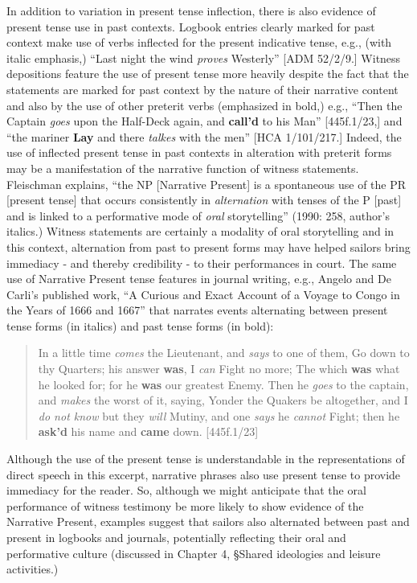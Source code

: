 \begin{styleStandard}
In addition to variation in present tense inflection, there is also evidence of present tense use in past contexts. Logbook entries clearly marked for past context make use of verbs inflected for the present indicative tense, e.g., (with italic emphasis,) “Last night the wind \textit{proves} Westerly” [ADM 52/2/9.] Witness depositions feature the use of present tense more heavily despite the fact that the statements are marked for past context by the nature of their narrative content and also by the use of other preterit verbs (emphasized in bold,) e.g., “Then the Captain \textit{goes} upon the Half-Deck again, and \textbf{call’d} to his Man” [445f.1/23,] and “the mariner \textbf{Lay} and there \textit{talkes} with the men” [HCA 1/101/217.] Indeed, the use of inflected present tense in past contexts in alteration with preterit forms may be a manifestation of the narrative function of witness statements. Fleischman explains, “the NP [Narrative Present] is a spontaneous use of the PR [present tense] that occurs consistently in \textit{alternation} with tenses of the P [past] and is linked to a performative mode of \textit{oral }storytelling” (1990: 258, author’s italics.) Witness statements are certainly a modality of oral storytelling and in this context, alternation from past to present forms may have helped sailors bring immediacy - and thereby credibility - to their performances in court. The same use of Narrative Present tense features in journal writing, e.g., Angelo and De Carli’s published work, “A Curious and Exact Account of a Voyage to Congo in the Years of 1666 and 1667” that narrates events alternating between present tense forms (in italics) and past tense forms (in bold):
\end{styleStandard}


\begin{quotation}
In a little time \textit{comes} the Lieutenant, and \textit{says} to one of them, Go down to thy Quarters; his answer \textbf{was}, I \textit{can} Fight no more; The which \textbf{was} what he looked for; for he \textbf{was} our greatest Enemy. Then he\textit{ goes} to the captain, and \textit{makes} the worst of it, saying, Yonder the Quakers be altogether, and I \textit{do not know} but they \textit{will }Mutiny, and one \textit{says} he \textit{cannot} Fight; then he \textbf{ask’d} his name and\textbf{ came} down. [445f.1/23]

\end{quotation}
\begin{styleStandard}
Although the use of the present tense is understandable in the representations of direct speech in this excerpt, narrative phrases also use present tense to provide immediacy for the reader. So, although we might anticipate that the oral performance of witness testimony be more likely to show evidence of the Narrative Present, examples suggest that sailors also alternated between past and present in logbooks and journals, potentially reflecting their oral and performative culture (discussed in Chapter 4, §Shared ideologies and leisure activities.) 
\end{styleStandard}


